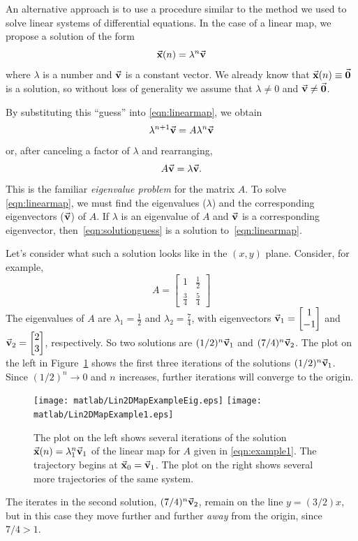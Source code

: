 An alternative approach is to use a procedure similar to the
method we used to solve linear systems of differential equations.
In the case of a linear map, we propose a solution of the
form
\begin{equation}
   \vec{\textbf{x}}(n) = \lambda^n \vec{\textbf{v}}
\label{eqn:solutionguess}
\end{equation}
where $\lambda$ is a number and $\vec{\textbf{v}}$ is a constant vector.
We already know that $\vec{\textbf{x}}(n)\equiv\vec{\textbf{0}}$ is a solution, so without
loss of generality we assume that $\lambda\ne 0$ and
$\vec{\textbf{v}} \ne \vec{\textbf{0}}$.

By substituting this ``guess'' into \eqref{eqn:linearmap},
we obtain
\begin{equation}
  \lambda^{n+1} \vec{\textbf{v}}  = A\lambda^n\vec{\textbf{v}}
\end{equation}
or, after canceling a factor of $\lambda$ and rearranging,
\begin{equation}
   A\vec{\textbf{v}} = \lambda \vec{\textbf{v}}.
\label{eqn:mapeigenvalueprob}
\end{equation}
This is the familiar \emph{eigenvalue problem}
for the matrix $A$.
To solve \eqref{eqn:linearmap}, we must find
the eigenvalues ($\lambda$) and
the corresponding eigenvectors ($\vec{\textbf{v}}$) of $A$.
If $\lambda$ is an eigenvalue of $A$ and $\vec{\textbf{v}}$ is a corresponding
eigenvector, then~\eqref{eqn:solutionguess} is a solution
to~\eqref{eqn:linearmap}.

Let's consider what such a solution looks like in the
$(x,y)$ plane.  Consider, for example,
\begin{equation}
   A = \begin{bmatrix} 1 & \frac{1}{2} \\
                      \frac{3}{4} & \frac{5}{4}
       \end{bmatrix}
\label{eqn:example1}
\end{equation}
The eigenvalues of $A$ are $\lambda_1 = \frac{1}{2}$
and $\lambda_2 = \frac{7}{4}$,
with eigenvectors $\vec{\textbf{v}}_1 = \begin{bmatrix} 1 \\ -1 \end{bmatrix}$
and $\vec{\textbf{v}}_2 = \begin{bmatrix} 2 \\ 3 \end{bmatrix}$, respectively.
So two solutions are $(1/2)^n\vec{\textbf{v}}_1$ and $(7/4)^n\vec{\textbf{v}}_2$.
The plot on the left in
Figure~\ref{fig:Lin2DMapExample1} shows the first three iterations
of the solutions $(1/2)^n\vec{\textbf{v}}_1$.  Since
$(1/2)^n\rightarrow 0$ and $n$ increases, further iterations
will converge to the origin.
\begin{figure}
\centerline{%
\texttt{[image: matlab/Lin2DMapExampleEig.eps]}
\texttt{[image: matlab/Lin2DMapExample1.eps]}
}
\caption{%
The plot on the left shows several iterations of the
solution $\vec{\textbf{x}}(n) = \lambda_1^n\vec{\textbf{v}}_1$ of the linear map
for $A$ given in \eqref{eqn:example1}.
The trajectory begins at
$\vec{\textbf{x}}_0 = \vec{\textbf{v}}_1$.
The plot on the right shows several more trajectories
of the same system.
}
\label{fig:Lin2DMapExample1}
\end{figure}
The iterates in the second solution, $(7/4)^n\vec{\textbf{v}}_2$,
remain on the line $y=(3/2)x$, but in this case they move further
and further \emph{away} from the origin, since $7/4 > 1$.


